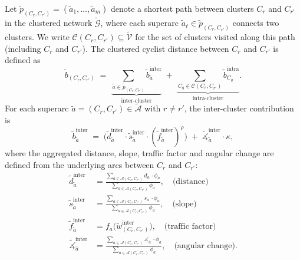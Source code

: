 \documentclass[lettersize,journal]{IEEEtran}
\begin{document}
Let $\tilde{p}_{(C_r,C_{r'})} = (\tilde{a}_1,\dots,\tilde{a}_m)$ denote a shortest path
between clusters $C_r$ and $C_{r'}$ in the clustered network
$\tilde{\mathcal{G}}$,
where each superarc $\tilde{a}_\ell \in \tilde{p}_{(C_r,C_{r'})}$ connects two clusters.  
We write $\mathcal{C}(C_r,C_{r'}) \subseteq \tilde{\mathcal{V}}$ for the set of clusters
visited along this path (including $C_r$ and $C_{r'}$). The clustered cyclist distance between $C_r$ and $C_{r'}$ is defined as
\begin{equation}
\label{eq:clustered_cyclist_distance}
  \tilde{b}_{(C_r,C_{r'})}
  \;=\;
  \underbrace{\sum_{\tilde{a} \in \tilde{p}_{(C_r,C_{r'})}} 
    \tilde{b}^{\mathrm{inter}}_{\tilde{a}}}_{\text{inter-cluster}}
  \;+\;
  \underbrace{\sum_{C_q \in \mathcal{C}(C_r,C_{r'})}
    \tilde{b}^{\mathrm{intra}}_{C_q}}_{\text{intra-cluster}}.
\end{equation}
For each superarc $\tilde{a} = (C_r,C_{r'}) \in \tilde{\mathcal{A}}$ with $r \neq r'$,
the inter-cluster contribution is
\begin{equation}
  \tilde{b}^{\mathrm{inter}}_{\tilde{a}}
  \;=\;
  \bigl(
    \tilde{d}^{\mathrm{inter}}_{\tilde{a}}
    \cdot
    \tilde{s}^{\mathrm{inter}}_{\tilde{a}}
    \cdot
    (\tilde{f}^{\mathrm{inter}}_{\tilde{a}})^{\rho}
  \bigr)
  \;+\;
  \tilde{\measuredangle}^{\mathrm{inter}}_{\tilde{a}} \cdot \kappa,
\end{equation}
where the aggregated distance, slope, traffic factor and angular change are defined from the
underlying arcs between $C_r$ and $C_{r'}$:
\begin{align}
  \tilde{d}^{\mathrm{inter}}_{\tilde{a}}
  &=
  \frac{
    \sum_{a \in \mathcal{A}(C_r,C_{r'})} d_a \,\cdot \phi_a
  }{
    \sum_{a \in \mathcal{A}(C_r,C_{r'})} \phi_a
  },
  \quad\text{(distance)}\\[0.5em]
  \tilde{s}^{\mathrm{inter}}_{\tilde{a}}
  &=
  \frac{
    \sum_{a \in \mathcal{A}(C_r,C_{r'})} s_a \,\cdot \phi_a
  }{
    \sum_{a \in \mathcal{A}(C_r,C_{r'})} \phi_a
  },
  \quad\text{(slope)}\\[0.5em]
  \tilde{f}^{\mathrm{inter}}_{\tilde{a}}
  &=
  f_a\bigl(\tilde{w}^{\mathrm{inter}}_{(C_r,C_{r'})}\bigr),
  \quad\text{(traffic factor)}\\[0.5em]
  \tilde{\measuredangle}^{\mathrm{inter}}_{\tilde{a}}
  &=
  \frac{
    \sum_{a \in \mathcal{A}(C_r,C_{r'})} \measuredangle_a \,\cdot \phi_a
  }{
    \sum_{a \in \mathcal{A}(C_r,C_{r'})} \phi_a
  },
  \quad\text{(angular change)}.
\end{align}
\end{document}
